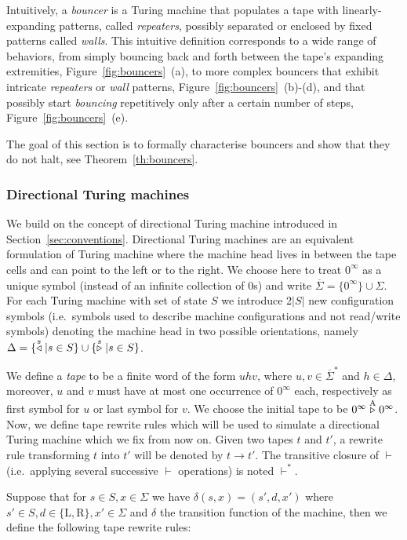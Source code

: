 Intuitively, a \emph{bouncer} is a Turing machine that populates a tape with
linearly-expanding patterns, called \textit{repeaters}, possibly separated or enclosed by fixed patterns called \textit{walls}. This intuitive definition corresponds to a wide range of behaviors, from simply bouncing back and forth between the tape's expanding extremities, Figure~\ref{fig:bouncers}~(a), to more complex bouncers that exhibit intricate \textit{repeaters} or \textit{wall} patterns, Figure~\ref{fig:bouncers}~(b)-(d), and that possibly start \textit{bouncing} repetitively only after a certain number of steps, Figure~\ref{fig:bouncers}~(e).

The goal of this section is to formally characterise bouncers and show that they do not halt, see Theorem~\ref{th:bouncers}.

\subsubsection{Directional Turing machines}\label{sec:bouncers:directionalTM}

We build on the concept of directional Turing machine introduced in Section~\ref{sec:conventions}. Directional Turing machines are an equivalent formulation of Turing machine where the machine head lives in between the tape cells and can point to the left or to the right. We choose here to treat $0^\infty$ as a unique symbol (instead of an infinite collection of 0s) and write $ \overline{\Sigma} = \{0^\infty\}\cup\Sigma$. For each Turing machine with set of state $S$ we introduce 2$|S|$ new configuration symbols (i.e.\ symbols used to describe machine configurations and not read/write symbols) denoting the machine head in two possible orientations, namely $\Delta = \{\stackrel{s}\triangleleft | s\in S\}\cup\{\stackrel{s}\triangleright| s \in S\}$.

We define a \textit{tape} to be a finite word of the form $uhv$, where $u,v\in \overline{\Sigma}^*$ and $h\in\Delta$, moreover, $u$ and $v$ must have at most one occurrence of $0^\infty$ each, respectively as first symbol for $u$ or last symbol for $v$. We choose the initial tape to be $0^\infty \stackrel{\text{A}}\triangleright 0^\infty$. Now, we define tape rewrite rules which will be used to simulate a directional Turing machine which we fix from now on. Given two tapes $t$ and $t'$, a rewrite rule transforming $t$ into $t'$ will be denoted by $t\to t'$. The transitive closure of $\vdash$ (i.e.\ applying several successive $\vdash$ operations) is noted $\vdash^*$.

Suppose that for $s\in S, x\in \Sigma$ we have $\delta(s,x) = (s',d,x')$ where $s'\in S, d \in \{\text{L},\text{R}\}, x' \in \Sigma$ and $\delta$ the transition function of the machine, then we define the following tape rewrite rules:


